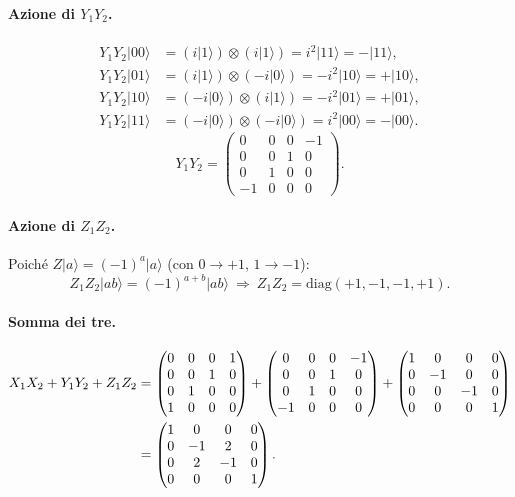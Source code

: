 \documentclass[11pt,a4paper]{article}
\newcommand{\ket}[1]{\lvert #1 \rangle}
\theoremstyle{definition}
\begin{document}
\paragraph{Azione di $Y_1Y_2$.}
\begin{align*}
Y_1Y_2\ket{00}&=(i\ket{1})\otimes(i\ket{1})=i^2\ket{11}=-\ket{11},\\
Y_1Y_2\ket{01}&=(i\ket{1})\otimes(-i\ket{0})=-i^2\ket{10}=+\ket{10},\\
Y_1Y_2\ket{10}&=(-i\ket{0})\otimes(i\ket{1})=-i^2\ket{01}=+\ket{01},\\
Y_1Y_2\ket{11}&=(-i\ket{0})\otimes(-i\ket{0})=i^2\ket{00}=-\ket{00}.
\end{align*}
\[
Y_1Y_2=\begin{pmatrix}0&0&0&-1\\0&0&1&0\\0&1&0&0\\-1&0&0&0\end{pmatrix}.
\]

\paragraph{Azione di $Z_1Z_2$.} Poiché $Z\ket{a}=(-1)^a\ket{a}$ (con $0\to+1$, $1\to-1$):
\[
Z_1Z_2\ket{ab}=(-1)^{a+b}\ket{ab}\ \Rightarrow\ Z_1Z_2=\mathrm{diag}(+1,-1,-1,+1).
\]

\paragraph{Somma dei tre.}
\begin{align}
X_1X_2+Y_1Y_2+Z_1Z_2
&=\begin{pmatrix}0&0&0&1\\0&0&1&0\\0&1&0&0\\1&0&0&0\end{pmatrix}
+\begin{pmatrix}0&0&0&-1\\0&0&1&0\\0&1&0&0\\-1&0&0&0\end{pmatrix}
+\begin{pmatrix}1&0&0&0\\0&-1&0&0\\0&0&-1&0\\0&0&0&1\end{pmatrix}\notag\\
&=\begin{pmatrix}1&0&0&0\\0&-1&2&0\\0&2&-1&0\\0&0&0&1\end{pmatrix}.
\label{eq:exch}
\end{align}
\end{document}

